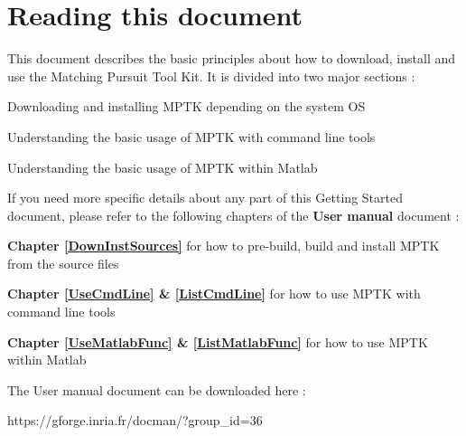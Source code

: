 \section{Reading this document}

This document describes the basic principles about how to download, install and use the Matching Pursuit Tool Kit. 
It is divided into two major sections : 

\begin{my_itemize}
	\item Downloading and installing MPTK depending on the system OS 
	\item Understanding the basic usage of MPTK with command line tools
	\item Understanding the basic usage of MPTK within Matlab
\end{my_itemize}

If you need more specific details about any part of this Getting Started document, please refer to the following chapters 
of the \textbf{User manual} document  :

\begin{my_itemize}
	\item \textbf{Chapter \ref{DownInstSources}} for how to pre-build, build and install MPTK from the source files
	\item \textbf{Chapter \ref{UseCmdLine} \& \ref{ListCmdLine}} for how to use MPTK with command line tools
	\item \textbf{Chapter \ref{UseMatlabFunc} \& \ref{ListMatlabFunc}} for how to use MPTK within Matlab
\end{my_itemize}

\noindent The User manual document can be downloaded here : 
\begin{my_itemize}
	\item https://gforge.inria.fr/docman/?group\_id=36
\end{my_itemize}

\clearpage